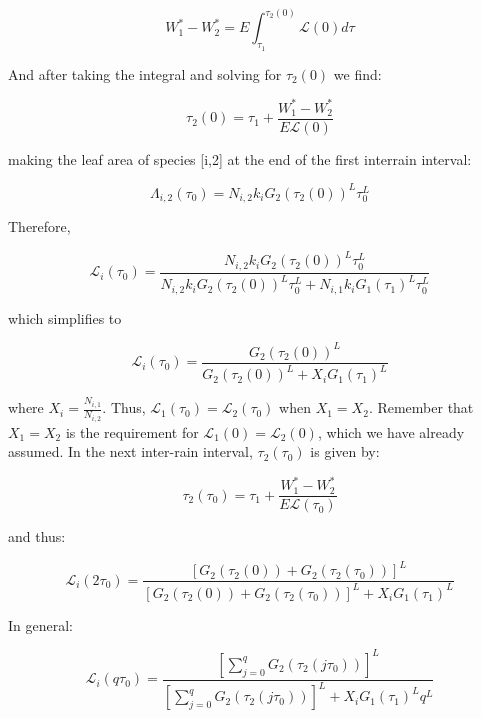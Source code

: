 \documentclass[11pt]{article}
\begin{document}
\begin{equation*}
     W^*_1 - W^*_2 = E \int_{\tau_1}^{\tau_2(0)} \mathcal{L}(0) d\tau
\end{equation*}

And after taking the integral and solving for \(\tau_2(0)\) we find:

\begin{equation*}
    \tau_2(0) = \tau_1 + \frac{W_1^* - W_2^*}{E \mathcal{L}(0)}
\end{equation*}

making the leaf area of species [i,2] at the end of the first interrain interval:

\begin{equation*}
    \Lambda_{i,2}(\tau_0) = N_{i,2} k_i G_2(\tau_2(0))^L \tau_0^L
\end{equation*}

Therefore,

\begin{equation*}
    \mathcal{L}_i(\tau_0) = \frac{N_{i,2} k_i G_2(\tau_2(0))^L \tau_0^L}{N_{i,2} k_i G_2(\tau_2(0))^L \tau_0^L + N_{i,1} k_i G_1(\tau_1)^L \tau_0^L}
\end{equation*}

which simplifies to

\begin{equation*}
     \mathcal{L}_i(\tau_0)= \frac{G_2(\tau_2(0))^L}{G_2(\tau_2(0))^L + X_i G_1(\tau_1)^L}
\end{equation*}

where \(X_i = \frac{N_{i,1}}{N_{i,2}}\). Thus, \(\mathcal{L}_1(\tau_0) = \mathcal{L}_2(\tau_0)\) when \(X_1 = X_2\). Remember that \(X_1 = X_2\) is the requirement for \(\mathcal{L}_1(0) = \mathcal{L}_2(0)\), which we have already assumed. In the next inter-rain interval, \(\tau_2(\tau_0)\) is given by:

\begin{equation*}
    \tau_2(\tau_0) = \tau_1 + \frac{W_1^* - W_2^*}{E \mathcal{L}(\tau_0)}
\end{equation*}

and thus:

\begin{equation*}
    \mathcal{L}_i(2\tau_0) = \frac{\left[G_2(\tau_2(0)) + G_2(\tau_2(\tau_0)) \right]^L }{\left[G_2(\tau_2(0)) + G_2(\tau_2(\tau_0)) \right]^L +X_i G_1(\tau_1)^L }
\end{equation*}

In general:

\begin{equation}
    \mathcal{L}_i(q\tau_0) = \frac{\left[ \sum_{j=0}^q G_2(\tau_2(j \tau_0))\right]^L }{\left[ \sum_{j=0}^q G_2(\tau_2(j \tau_0))\right]^L + X_i G_1(\tau_1)^L q^L}
\end{equation}
\end{document}
